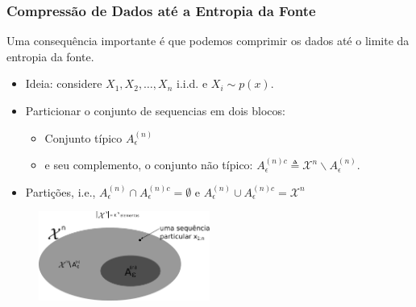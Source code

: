 \begin{frame}%
  \frametitle{Compressão de Dados até a Entropia da Fonte}
  Uma consequência importante é que podemos comprimir os dados até o limite da entropia da fonte.
  \begin{itemize}
  \item Ideia: considere $X_1, X_2, \ldots, X_n$ i.i.d. e $X_i \sim p(x)$.
  \item Particionar o conjunto de sequencias em dois blocos:
        \begin{itemize}
        \item Conjunto típico $A_\epsilon^{(n)}$
        \item e seu complemento, o conjunto não típico: $A_\epsilon^{(n)c} \triangleq \mathcal{X}^n \backslash A_\epsilon^{(n)}$.
        \end{itemize}
  \item Partições, i.e., $A_\epsilon^{(n)} \cap A_\epsilon^{(n)c} = \emptyset$ e $A_\epsilon^{(n)} \cup A_\epsilon^{(n)c} = \mathcal{X}^n$
  \end{itemize}

  \begin{figure}[h!]
  \centering
  \includegraphics[width=0.5\textwidth]{images/particao2.pdf}
  \label{fig:particao}
  \end{figure}

\end{frame}


